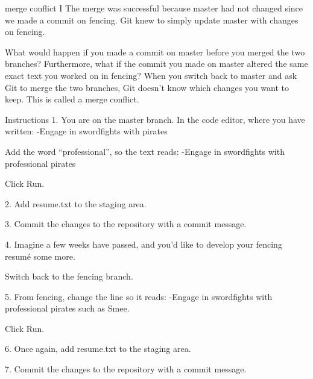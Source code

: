 merge conflict I
    The merge was successful because master had not changed since we made a commit on fencing. Git knew to simply update master with changes on fencing.

    What would happen if you made a commit on master before you merged the two branches? Furthermore, what if the commit you made on master altered the same exact text you worked on in fencing? When you switch back to master and ask Git to merge the two branches, Git doesn’t know which changes you want to keep. This is called a merge conflict.

Instructions
    1.
    You are on the master branch. In the code editor, where you have written:
        -Engage in swordfights with pirates
    
    Add the word “professional”, so the text reads:
        -Engage in swordfights with professional pirates
    
    Click Run.

    2.
    Add resume.txt to the staging area.

    3.
    Commit the changes to the repository with a commit message.

    4.
    Imagine a few weeks have passed, and you’d like to develop your fencing resumé some more.

    Switch back to the fencing branch.

    5.
    From fencing, change the line so it reads:
        -Engage in swordfights with professional pirates such as Smee. 
    
    Click Run.

    6.
    Once again, add resume.txt to the staging area.

    7.
    Commit the changes to the repository with a commit message.